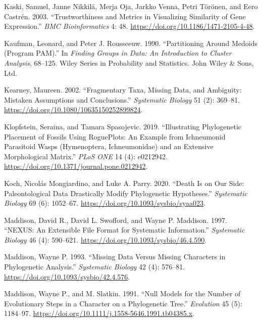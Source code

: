 \begin{CSLReferences}{1}{0}
\leavevmode{}%
Kaski, Samuel, Janne Nikkilä, Merja Oja, Jarkko Venna, Petri Törönen, and Eero Castrén. 2003. {``Trustworthiness and Metrics in Visualizing Similarity of Gene Expression.''} \emph{BMC Bioinformatics} 4: 48. \url{https://doi.org/10.1186/1471-2105-4-48}.

\leavevmode{}%
Kaufman, Leonard, and Peter J. Rousseeuw. 1990. {``Partitioning Around Medoids ({Program PAM}).''} In \emph{Finding Groups in Data: An Introduction to Cluster Analysis}, 68--125. Wiley {Series} in {Probability} and {Statistics}. {John Wiley \& Sons, Ltd}.

\leavevmode{}%
Kearney, Maureen. 2002. {``Fragmentary Taxa, Missing Data, and Ambiguity: Mistaken Assumptions and Conclusions.''} \emph{Systematic Biology} 51 (2): 369--81. \url{https://doi.org/10.1080/10635150252899824}.

\leavevmode{}%
Klopfstein, Seraina, and Tamara Spasojevic. 2019. {``Illustrating Phylogenetic Placement of Fossils Using {RoguePlots}: An Example from Ichneumonid Parasitoid Wasps ({Hymenoptera}, {Ichneumonidae}) and an Extensive Morphological Matrix.''} \emph{PLoS ONE} 14 (4): e0212942. \url{https://doi.org/10.1371/journal.pone.0212942}.

\leavevmode{}%
Koch, Nicolás Mongiardino, and Luke A. Parry. 2020. {``Death Is on Our Side: Paleontological Data Drastically Modify Phylogenetic Hypotheses.''} \emph{Systematic Biology} 69 (6): 1052--67. \url{https://doi.org/10.1093/sysbio/syaa023}.

\leavevmode{}%
Maddison, David R., David L. Swofford, and Wayne P. Maddison. 1997. {``{NEXUS}: An Extensible File Format for Systematic Information.''} \emph{Systematic Biology} 46 (4): 590--621. \url{https://doi.org/10.1093/sysbio/46.4.590}.

\leavevmode{}%
Maddison, Wayne P. 1993. {``Missing Data Versus Missing Characters in Phylogenetic Analysis.''} \emph{Systematic Biology} 42 (4): 576--81. \url{https://doi.org/10.1093/sysbio/42.4.576}.

\leavevmode{}%
Maddison, Wayne P., and M. Slatkin. 1991. {``Null Models for the Number of Evolutionary Steps in a Character on a Phylogenetic Tree.''} \emph{Evolution} 45 (5): 1184--97. \url{https://doi.org/10.1111/j.1558-5646.1991.tb04385.x}.


\end{CSLReferences}
